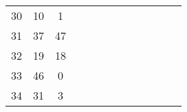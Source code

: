 \begin{table}[tb]
\begin{tabular}{|c|c|c|cccccccccc}
	30 & 10 & 1  &                         &                         &                         &                         &                        &                         &                         &                         &                        &                        \\ \cline{1-3}
	31 & 37 & 47 &                         &                         &                         &                         &                        &                         &                         &                         &                        &                        \\ \cline{1-3}
	32 & 19 & 18 &                         &                         &                         &                         &                        &                         &                         &                         &                        &                        \\ \cline{1-3}
	33 & 46 & 0  &                         &                         &                         &                         &                        &                         &                         &                         &                        &                        \\ \cline{1-3}
	34 & 31 & 3  &                         &                         &                         &                         &                        &                         &                         &                         &                        &                        \\ \cline{1-3}
\end{tabular}
	
	
\end{table}